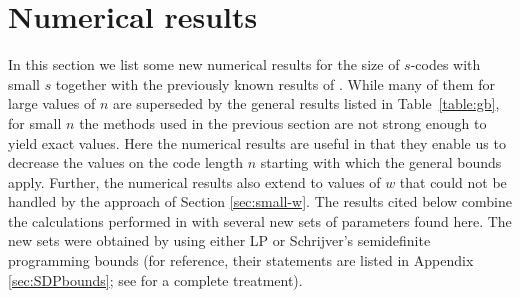 \documentclass{amsart}
\begin{document}


\section{Numerical results} \label{sec:numerical}

In this section we list some new numerical results for the size of $s$-codes with small $s$ together with the previously
known results of \cite{BM11,MN11}. While many of them for large values of $n$ are superseded by the general results listed in
Table~\ref{table:gb}, for small $n$ the methods used in the previous section are not strong enough to yield exact values.
Here the numerical results are useful in that they enable us to decrease the values on the code length $n$ starting with which
the general bounds apply. Further, the numerical results also extend to values of $w$ that could not be handled by the approach of Section \ref{sec:small-w}.  The results cited below combine the calculations performed in 
\cite{BM11,MN11} with several new sets of parameters found here. The new sets were obtained by using
either LP or Schrijver's semidefinite programming bounds (for reference, their statements are listed in
Appendix \ref{sec:SDPbounds}; see \cite{S05}  for a complete treatment).
 
\end{document}
